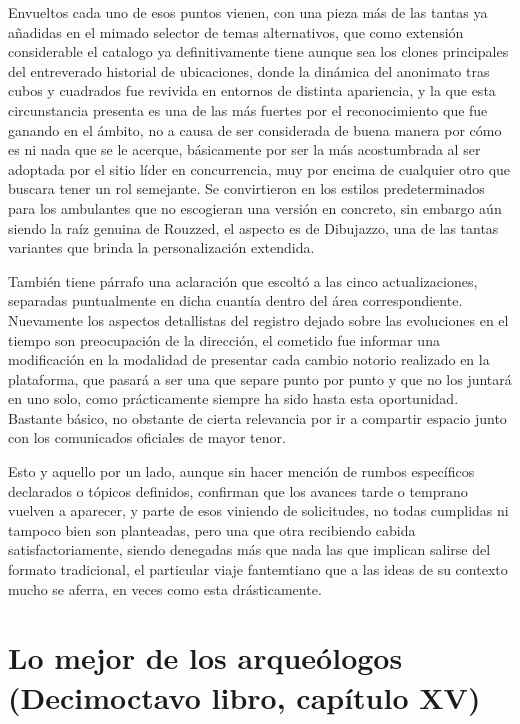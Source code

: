 \documentclass[
]{book}
\begin{document}
Envueltos cada uno de esos puntos vienen, con una pieza más de las tantas ya añadidas en el mimado selector de temas alternativos, que como extensión considerable el catalogo ya definitivamente tiene aunque sea los clones principales del entreverado historial de ubicaciones, donde la dinámica del anonimato tras cubos y cuadrados fue revivida en entornos de distinta apariencia, y la que esta circunstancia presenta es una de las más fuertes por el reconocimiento que fue ganando en el ámbito, no a causa de ser considerada de buena manera por cómo es ni nada que se le acerque, básicamente por ser la más acostumbrada al ser adoptada por el sitio líder en concurrencia, muy por encima de cualquier otro que buscara tener un rol semejante. Se convirtieron en los estilos predeterminados para los ambulantes que no escogieran una versión en concreto, sin embargo aún siendo la raíz genuina de Rouzzed, el aspecto es de Dibujazzo, una de las tantas variantes que brinda la personalización extendida.

También tiene párrafo una aclaración que escoltó a las cinco actualizaciones, separadas puntualmente en dicha cuantía dentro del área correspondiente. Nuevamente los aspectos detallistas del registro dejado sobre las evoluciones en el tiempo son preocupación de la dirección, el cometido fue informar una modificación en la modalidad de presentar cada cambio notorio realizado en la plataforma, que pasará a ser una que separe punto por punto y que no los juntará en uno solo, como prácticamente siempre ha sido hasta esta oportunidad. Bastante básico, no obstante de cierta relevancia por ir a compartir espacio junto con los comunicados oficiales de mayor tenor.

Esto y aquello por un lado, aunque sin hacer mención de rumbos específicos declarados o tópicos definidos, confirman que los avances tarde o temprano vuelven a aparecer, y parte de esos viniendo de solicitudes, no todas cumplidas ni tampoco bien son planteadas, pero una que otra recibiendo cabida satisfactoriamente, siendo denegadas más que nada las que implican salirse del formato tradicional, el particular viaje fantemtiano que a las ideas de su contexto mucho se aferra, en veces como esta drásticamente.

\hypertarget{lo-mejor-de-los-arqueuxf3logos-decimoctavo-libro-capuxedtulo-xv}{%
\section{Lo mejor de los arqueólogos (Decimoctavo libro, capítulo XV)}\label{lo-mejor-de-los-arqueuxf3logos-decimoctavo-libro-capuxedtulo-xv}}
\end{document}
